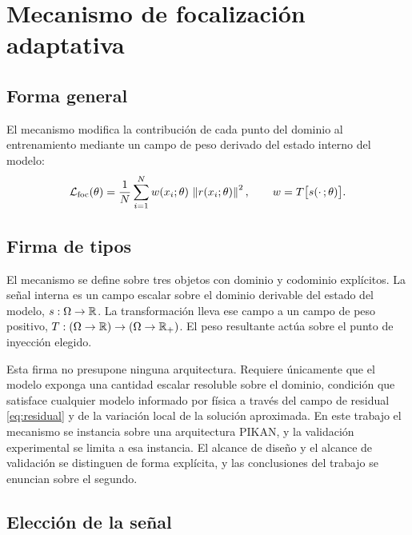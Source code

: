 \section{Mecanismo de focalización adaptativa}

\subsection{Forma general}

El mecanismo modifica la contribución de cada punto del dominio al entrenamiento mediante un campo de peso derivado del estado interno del modelo:
\begin{equation}
  \mathcal{L}_{\text{foc}}(\theta)
  = \frac{1}{N}\sum_{i=1}^{N} w(x_i;\theta)\,
    \left\| r(x_i;\theta) \right\|^2 ,
  \qquad
  w = T\big[s(\cdot\,;\theta)\big].
  \label{eq:mecanismo}
\end{equation}


\subsection{Firma de tipos}

El mecanismo se define sobre tres objetos con dominio y codominio explícitos. La señal interna es un campo escalar sobre el dominio derivable del estado del modelo, $s : \Omega \to \mathbb{R}$. La transformación lleva ese campo a un campo de peso positivo, $T : (\Omega \to \mathbb{R}) \to (\Omega \to \mathbb{R}_{+})$. El peso resultante actúa sobre el punto de inyección elegido.

Esta firma no presupone ninguna arquitectura. Requiere únicamente que el modelo exponga una cantidad escalar resoluble sobre el dominio, condición que satisface cualquier modelo informado por física a través del campo de residual \eqref{eq:residual} y de la variación local de la solución aproximada. En este trabajo el mecanismo se instancia sobre una arquitectura PIKAN, y la validación experimental se limita a esa instancia. El alcance de diseño y el alcance de validación se distinguen de forma explícita, y las conclusiones del trabajo se enuncian sobre el segundo.

\subsection{Elección de la señal}

